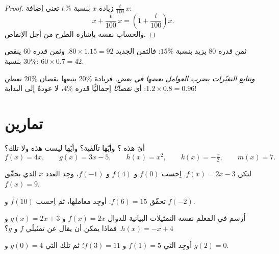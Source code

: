 \begin{proof}
زيادة $x$ بنسبة $t\,\%$ تعني إضافة $\frac{t}{100}\,x$:
\[
x + \frac{t}{100}\,x = \left(1 + \frac{t}{100}\right) x .
\]
والحساب نفسه بإشارة الطرح من أجل الإنقاص.
\end{proof}

\begin{example}\label{ex:g9:linfunc:percent}
ثمن قدره $80$ يزيد بنسبة $15\%$: فالثمن الجديد
$80 \times 1.15 = 92$. وثمن قدره $60$ ينقص بنسبة $30\%$:
$60 \times 0.7 = 42$.

\emph{وتتابع التغيّرات يضرب العوامل بعضها في بعض.} فزيادة $20\%$
يتبعها نقصان $20\%$ تعطي
$1.2 \times 0.8 = 0.96$: أي \emph{نقصانًا} إجماليًّا قدره $4\%$، لا
عودةً إلى البداية!
\end{example}

\section{تمارين}

\begin{exercise}[$\star$]\label{exo:g9:linfunc:1}
أيّ هذه ؟ وأيّها تآلفية؟ وأيّها ليست هذه ولا تلك؟
\[
f(x) = 4x, \qquad
g(x) = 3x - 5, \qquad
h(x) = x^2, \qquad
k(x) = -\tfrac x2, \qquad
m(x) = 7 .
\]
\end{exercise}

\begin{exercise}[$\star$]\label{exo:g9:linfunc:2}
لتكن $f(x) = 2x - 3$. اِحسب $f(0)$ و $f(4)$ و $f(-1)$، وجِد العدد
$x$ الذي يحقّق $f(x) = 9$.
\end{exercise}

\begin{exercise}[$\star$]\label{exo:g9:linfunc:3}
 تحقّق $f(6) = 15$. أوجِد معاملها، ثم اِحسب $f(10)$
و $f(-2)$.
\end{exercise}

\begin{exercise}[$\star$]\label{exo:g9:linfunc:4}
اُرسم في المعلم نفسه التمثيلات البيانية للدوال $f(x) = 2x$
و $g(x) = 2x + 3$ و $h(x) = -x + 4$. فماذا يمكن أن يقال عن تمثيلَي
$f$ و $g$؟
\end{exercise}

\begin{exercise}[$\star$]\label{exo:g9:linfunc:5}
أوجِد  التي $f(1) = 5$ و $f(3) = 11$؛ ثم تلك التي
$g(0) = 4$ و $g(2) = 0$.
\end{exercise}

